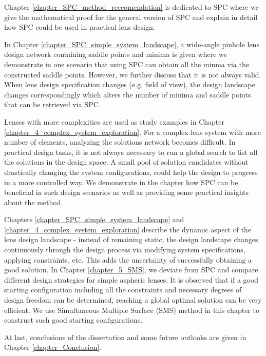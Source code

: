Chapter \ref{chapter_SPC_method_reccomendation} is dedicated to SPC where we give the mathematical proof for the general version of SPC and explain in detail how SPC could be used in practical lens design. 

In Chapter \ref{chapter_SPC_simple_system_landscape}, a wide-angle pinhole lens design network containing saddle points and minima is given where we demonstrate in one scenario that using SPC can obtain all the minma via the constructed saddle points. However, we further discuss that it is not always valid. When lens design specification changes (e.g. field of view), the design landscape changes correspondingly which alters the number of minima and saddle points that can be retrieved via SPC.  

Lenses with more complexities are used as study examples in Chapter \ref{chapter_4_complex_system_exploration}. For a complex lens system with more number of elements, analyzing the solutions network becomes difficult. In practical design tasks, it is not always necessary to run a global search to list all the solutions in the design space. A small pool of solution candidates without drastically changing the system configurations, could help the design to progress in a more controlled way. We demonstrate in the chapter how SPC can be beneficial in such design scenarios as well as providing some practical insights about the method. 

Chapters \ref{chapter_SPC_simple_system_landscape} and \ref{chapter_4_complex_system_exploration} describe the dynamic aspect of the lens design landscape - instead of remaining static, the design landscape changes continuously through the design process via modifying system specifications, applying constraints, etc. This adds the uncertainty of successfully obtaining a good solution.  In Chapter \ref{chapter_5_SMS}, we deviate from SPC and compare different design strategies for simple aspheric lenses. It is observed that if a good starting configuration including all the constraints and necessary degrees of design freedom can be determined, reaching a global optimal solution can be very efficient. We use Simultaneous Multiple Surface (SMS) method in this chapter to construct such good starting configurations. 

At last, conclusions of the dissertation and some future outlooks are given in Chapter \ref{chapter_Conclusion}.


